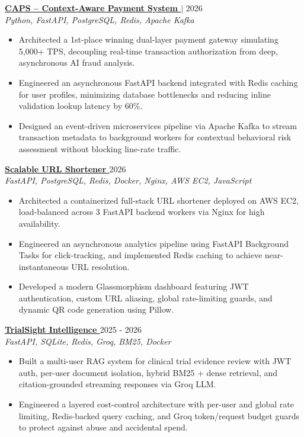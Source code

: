 \documentclass[letterpaper,10.8pt]{article}
\newcommand{\resumeItem}[1]{\item\small{#1}}
\newcommand{\resumeItemListStart}{\begin{itemize}[topsep=0pt]}
\newcommand{\resumeItemListEnd}{\end{itemize}\vspace{-4pt}}
\begin{document}
\item
\textbf{\href{http://52.64.46.117//project1}{\color{blue}CAPS -- Context-Aware Payment System }}\href{http://52.64.46.117//project1}{\faGithub} $|$ \hfill 2026 \\
\textit{Python, FastAPI, PostgreSQL, Redis, Apache Kafka}
\resumeItemListStart
  \resumeItem{Architected a 1st-place winning dual-layer payment gateway simulating 5,000+ TPS, decoupling real-time transaction authorization from deep, asynchronous AI fraud analysis.}
  \resumeItem{Engineered an asynchronous FastAPI backend integrated with Redis caching for user profiles, minimizing database bottlenecks and reducing inline validation lookup latency by 60\%.}
  \resumeItem{Designed an event-driven microservices pipeline via Apache Kafka to stream transaction metadata to background workers for contextual behavioral risk assessment without blocking line-rate traffic.}
\resumeItemListEnd

\item
\textbf{\href{http://52.64.46.117//}{\color{blue}Scalable URL Shortener }}\href{http://52.64.46.117//project2}{\faGithub} \hfill 2026 \\
\textit{FastAPI, PostgreSQL, Redis, Docker, Nginx, AWS EC2, JavaScript}
\resumeItemListStart
  \resumeItem{Architected a containerized full-stack URL shortener deployed on AWS EC2, load-balanced across 3 FastAPI backend workers via Nginx for high availability.}
  \resumeItem{Engineered an asynchronous analytics pipeline using FastAPI Background Tasks for click-tracking, and implemented Redis caching to achieve near-instantaneous URL resolution.}
  \resumeItem{Developed a modern Glassmorphism dashboard featuring JWT authentication, custom URL aliasing, global rate-limiting guards, and dynamic QR code generation using Pillow.}
\resumeItemListEnd

\item
\textbf{\href{http://52.64.46.117//proj3dep}{\color{blue}TrialSight Intelligence }}\href{http://52.64.46.117//project3}{\faGithub}  \hfill 2025 - 2026 \\
\textit{FastAPI, SQLite, Redis, Groq, BM25, Docker}
\resumeItemListStart
  \resumeItem{Built a multi-user RAG system for clinical trial evidence review with JWT auth, per-user document isolation, hybrid BM25 + dense retrieval, and citation-grounded streaming responses via Groq LLM.}
  \resumeItem{Engineered a layered cost-control architecture with per-user and global rate limiting, Redis-backed query caching, and Groq token/request budget guards to protect against abuse and accidental spend.}
\resumeItemListEnd
\end{document}
